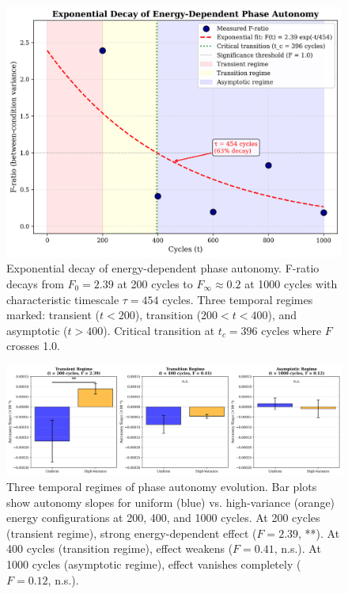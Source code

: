 \documentclass[11pt]{article}
\begin{document}
\begin{figure}[t]
\centering
\includegraphics[width=0.95\linewidth]{figure1_decay_curve.png}
\caption{Exponential decay of energy-dependent phase autonomy. F-ratio decays from $F_0 = 2.39$ at 200 cycles to $F_\infty \approx 0.2$ at 1000 cycles with characteristic timescale $\tau = 454$ cycles. Three temporal regimes marked: transient ($t < 200$), transition ($200 < t < 400$), and asymptotic ($t > 400$). Critical transition at $t_c = 396$ cycles where $F$ crosses 1.0.}
\end{figure}

\begin{figure}[t]
\centering
\includegraphics[width=0.95\linewidth]{figure2_temporal_regimes.png}
\caption{Three temporal regimes of phase autonomy evolution. Bar plots show autonomy slopes for uniform (blue) vs. high-variance (orange) energy configurations at 200, 400, and 1000 cycles. At 200 cycles (transient regime), strong energy-dependent effect ($F = 2.39$, **). At 400 cycles (transition regime), effect weakens ($F = 0.41$, n.s.). At 1000 cycles (asymptotic regime), effect vanishes completely ($F = 0.12$, n.s.).}
\end{figure}
\end{document}
